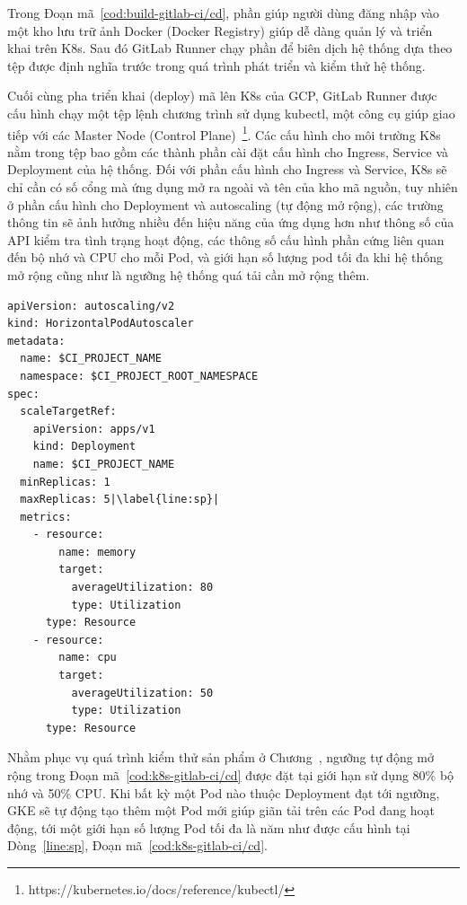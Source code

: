 Trong Đoạn mã~\ref{cod:build-gitlab-ci/cd}, phần  giúp người dùng đăng nhập vào một kho lưu trữ ảnh Docker (Docker Registry) giúp dễ dàng quản lý và triển khai trên K8s.
Sau đó GitLab Runner chạy phần  để biên dịch hệ thống dựa theo tệp  được định nghĩa trước trong quá trình phát triển và kiểm thử hệ thống.

Cuối cùng pha triển khai (deploy) mã lên K8s của GCP, GitLab Runner được cấu hình chạy một tệp lệnh chương trình sử dụng kubectl, một công cụ giúp giao tiếp với các Master Node (Control Plane)~\footnote{https://kubernetes.io/docs/reference/kubectl/}.
Các cấu hình cho môi trường K8s nằm trong tệp  bao gồm các thành phần cài đặt cấu hình cho Ingress, Service và Deployment của hệ thống.
Đối với phần cấu hình cho Ingress và Service, K8s sẽ chỉ cần có số cổng mà ứng dụng mở ra ngoài và tên của kho mã nguồn, tuy nhiên ở phần cấu hình cho Deployment và autoscaling (tự động mở rộng), các trường thông tin sẽ ảnh hưởng nhiều đến hiệu năng của ứng dụng hơn như thông số của API kiểm tra tình trạng hoạt động, các thông số cấu hình phần cứng liên quan đến bộ nhớ và CPU cho mỗi Pod, và giới hạn số lượng pod tối đa khi hệ thống mở rộng cũng như là ngưỡng hệ thống quá tải cần mở rộng thêm.
\begin{lstlisting}[style=yaml, float,floatplacement=H,caption={Đoạn mã cấu hình cài đặt tự động mở rộng Kubernetes cho GitLab Runner.}, label={cod:k8s-gitlab-ci/cd},  captionpos=b, escapechar=|]
apiVersion: autoscaling/v2
kind: HorizontalPodAutoscaler
metadata:
  name: $CI_PROJECT_NAME
  namespace: $CI_PROJECT_ROOT_NAMESPACE
spec:
  scaleTargetRef:
    apiVersion: apps/v1
    kind: Deployment
    name: $CI_PROJECT_NAME
  minReplicas: 1
  maxReplicas: 5|\label{line:sp}|
  metrics:
    - resource:
        name: memory
        target:
          averageUtilization: 80
          type: Utilization
      type: Resource
    - resource:
        name: cpu
        target:
          averageUtilization: 50
          type: Utilization
      type: Resource
\end{lstlisting}
Nhằm phục vụ quá trình kiểm thử sản phẩm ở Chương~, ngưỡng tự động mở rộng trong Đoạn mã~\ref{cod:k8s-gitlab-ci/cd} được đặt tại giới hạn sử dụng 80\% bộ nhớ và 50\% CPU.
Khi bất kỳ một Pod nào thuộc Deployment đạt tới ngưỡng, GKE sẽ tự động tạo thêm một Pod mới giúp giãn tải trên các Pod đang hoạt động, tới một giới hạn số lượng Pod tối đa là năm như được cấu hình tại Dòng~\ref{line:sp}, Đoạn mã~\ref{cod:k8s-gitlab-ci/cd}.
